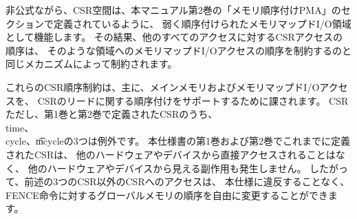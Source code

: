 \begin{commentary}
\begin{comment}
Informally, the CSR space acts as a weakly ordered memory-mapped I/O region, as
defined by the Memory-Ordering PMAs section in Volume II of this manual. As a
result, the order of CSR accesses with respect to all other accesses is
constrained by the same mechanisms that constrain the order of memory-mapped
I/O accesses to such a region.
\end{comment}

非公式ながら、CSR空間は、本マニュアル第2巻の「メモリ順序付けPMA」のセクションで定義されているように、
弱く順序付けられたメモリマップドI/O領域として機能します。
その結果、他のすべてのアクセスに対するCSRアクセスの順序は、
そのような領域へのメモリマップドI/Oアクセスの順序を制約するのと同じメカニズムによって制約されます。

\begin{comment}
These CSR-ordering constraints are imposed primarily to support ordering main
memory and memory-mapped I/O accesses with respect to reads of the {\tt time}
CSR.  With the exception of the {\tt time}, {\tt cycle}, and {\tt mcycle} CSRs,
the CSRs defined thus far in Volumes I and II of this specification are not
directly accessible to other harts or devices and cause no side effects visible
to other harts or devices.  Thus, accesses to CSRs other than the
aforementioned three can be freely reordered in the global memory order
with respect to FENCE instructions
without violating this specification.
\end{comment}

これらのCSR順序制約は、主に、メインメモリおよびメモリマップドI/Oアクセスを、
CSRのリードに関する順序付けをサポートするために課されます。
CSR  ただし、第1巻と第2巻で定義されたCSRのうち、
{\\ time}、{\\ cycle}、{\t mcycle}の3つは例外です。
本仕様書の第1巻および第2巻でこれまでに定義されたCSRは、
他のハードウェアやデバイスから直接アクセスされることはなく、
他のハードウェアやデバイスから見える副作用も発生しません。 
したがって、前述の3つのCSR以外のCSRへのアクセスは、
本仕様に違反することなく、FENCE命令に対するグローバルメモリの順序を自由に変更することができます。
\end{commentary}

\begin{comment}
The hardware platform may define that accesses to certain CSRs are
strongly ordered, as defined by the Memory-Ordering PMAs section in Volume II
of this manual. Accesses to strongly ordered CSRs have stronger ordering
constraints with respect to accesses to both weakly ordered CSRs and accesses
to memory-mapped I/O regions.
\end{comment}

